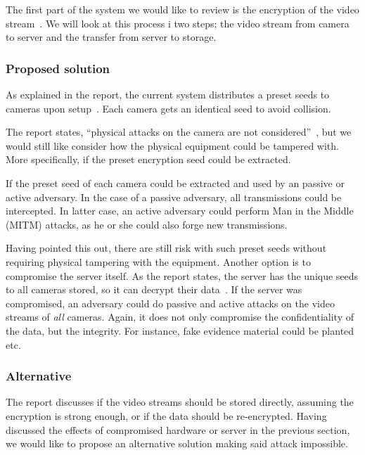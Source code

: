 

The first part of the system we would like to review is the encryption
of the video stream~\cite[sec. 3]{8}. We will look at this process i
two steps; the video stream from camera to server and the transfer
from server to storage.

\subsubsection{Proposed solution}

As explained in the report, the current system distributes a preset
seeds to cameras upon setup~\cite[sec. 3.2.4]{8}. Each camera gets an
identical seed to avoid collision.

The report states, ``physical attacks on the camera are not
considered''~\cite[p. 2]{8}, but we would still like consider how the
physical equipment could be tampered with. More specifically, if the
preset encryption seed could be extracted.

If the preset seed of each camera could be extracted and used by an
passive or active adversary. In the case of a passive adversary, all
transmissions could be intercepted. In latter case, an active
adversary could perform Man in the Middle (MITM) attacks, as he or she
could also forge new transmissions.

Having pointed this out, there are still risk with such preset seeds
without requiring physical tampering with the equipment. Another
option is to compromise the server itself. As the report states, the
server has the unique seeds to all cameras stored, so it can decrypt
their data~\cite[p. 8]{8}. If the server was compromised, an adversary
could do passive and active attacks on the video streams of \emph{all}
cameras. Again, it does not only compromise the confidentiality of the
data, but the integrity. For instance, fake evidence material could be
planted etc.


\subsubsection{Alternative}

The report discusses if the video streams should be stored directly,
assuming the encryption is strong enough, or if the data should be
re-encrypted. Having discussed the effects of compromised hardware or
server in the previous section, we would like to propose an
alternative solution making said attack impossible.

